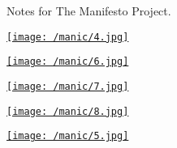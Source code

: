 Notes for The Manifesto Project.

\href{/manic/4.jpg}{\texttt{[image: /manic/4.jpg]}}

\href{/manic/6.jpg}{\texttt{[image: /manic/6.jpg]}}

\href{/manic/7.jpg}{\texttt{[image: /manic/7.jpg]}}

\href{/manic/8.jpg}{\texttt{[image: /manic/8.jpg]}}

\href{/manic/5.jpg}{\texttt{[image: /manic/5.jpg]}}
